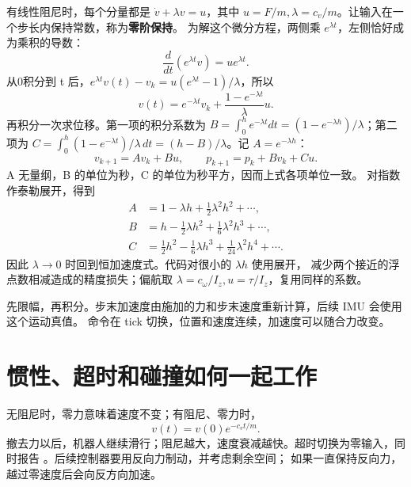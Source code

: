 有线性阻尼时，每个分量都是 $\dot v+\lambda v=u$，其中
$u=F/m,\lambda=c_v/m$。让输入在一个步长内保持常数，称为\textbf{零阶保持}。
为解这个微分方程，两侧乘 $e^{\lambda t}$，左侧恰好成为乘积的导数：
\begin{equation}
\frac{d}{dt}(e^{\lambda t}v)=ue^{\lambda t}.
\end{equation}
从0积分到 t 后，$e^{\lambda t}v(t)-v_k=u(e^{\lambda t}-1)/\lambda$，所以
\begin{equation}
v(t)=e^{-\lambda t}v_k+\frac{1-e^{-\lambda t}}{\lambda}u.
\end{equation}
再积分一次求位移。第一项的积分系数为
$B=\int_0^h e^{-\lambda t}dt=(1-e^{-\lambda h})/\lambda$；第二项为
$C=\int_0^h(1-e^{-\lambda t})/\lambda\,dt=(h-B)/\lambda$。记 $A=e^{-\lambda h}$：
\begin{equation}
v_{k+1}=Av_k+Bu,\qquad p_{k+1}=p_k+Bv_k+Cu.
\end{equation}
A 无量纲，B 的单位为秒，C 的单位为秒平方，因而上式各项单位一致。
对指数作泰勒展开，得到
\begin{align}
A&=1-\lambda h+\tfrac12\lambda^2h^2+\cdots,\\
B&=h-\tfrac12\lambda h^2+\tfrac16\lambda^2h^3+\cdots,\\
C&=\tfrac12h^2-\tfrac16\lambda h^3+\tfrac1{24}\lambda^2h^4+\cdots.
\end{align}
因此 $\lambda\to0$ 时回到恒加速度式。代码对很小的 $\lambda h$ 使用展开，
减少两个接近的浮点数相减造成的精度损失；偏航取 $\lambda=c_\omega/I_z,u=\tau/I_z$，复用同样的系数。

\par\noindent\begin{minipage}{\linewidth}

\end{minipage}\par
先限幅，再积分。步末加速度由施加的力和步末速度重新计算，后续 IMU 会使用这个运动真值。
命令在 tick 切换，位置和速度连续，加速度可以随合力改变。

\section{惯性、超时和碰撞如何一起工作}
无阻尼时，零力意味着速度不变；有阻尼、零力时，
\begin{equation}
v(t)=v(0)e^{-c_vt/m}.
\end{equation}
撤去力以后，机器人继续滑行；阻尼越大，速度衰减越快。超时切换为零输入，同时报告
。后续控制器要用反向力制动，并考虑剩余空间；
如果一直保持反向力，越过零速度后会向反方向加速。

